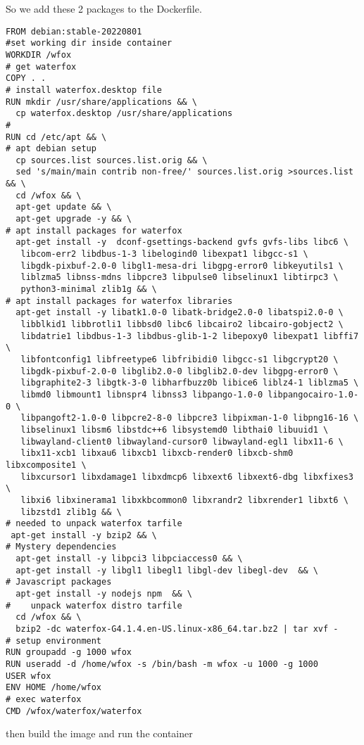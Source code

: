 \documentclass{article}  %
\begin{document}
So we add these 2 packages to the Dockerfile.
\begin{verbatim}
FROM debian:stable-20220801
#set working dir inside container
WORKDIR /wfox
# get waterfox
COPY . .
# install waterfox.desktop file
RUN mkdir /usr/share/applications && \
  cp waterfox.desktop /usr/share/applications
#
RUN cd /etc/apt && \
# apt debian setup
  cp sources.list sources.list.orig && \
  sed 's/main/main contrib non-free/' sources.list.orig >sources.list && \
  cd /wfox && \
  apt-get update && \
  apt-get upgrade -y && \
# apt install packages for waterfox
  apt-get install -y  dconf-gsettings-backend gvfs gvfs-libs libc6 \
   libcom-err2 libdbus-1-3 libelogind0 libexpat1 libgcc-s1 \
   libgdk-pixbuf-2.0-0 libgl1-mesa-dri libgpg-error0 libkeyutils1 \
   liblzma5 libnss-mdns libpcre3 libpulse0 libselinux1 libtirpc3 \
   python3-minimal zlib1g && \
# apt install packages for waterfox libraries
  apt-get install -y libatk1.0-0 libatk-bridge2.0-0 libatspi2.0-0 \
   libblkid1 libbrotli1 libbsd0 libc6 libcairo2 libcairo-gobject2 \
   libdatrie1 libdbus-1-3 libdbus-glib-1-2 libepoxy0 libexpat1 libffi7 \
   libfontconfig1 libfreetype6 libfribidi0 libgcc-s1 libgcrypt20 \
   libgdk-pixbuf-2.0-0 libglib2.0-0 libglib2.0-dev libgpg-error0 \
   libgraphite2-3 libgtk-3-0 libharfbuzz0b libice6 liblz4-1 liblzma5 \
   libmd0 libmount1 libnspr4 libnss3 libpango-1.0-0 libpangocairo-1.0-0 \
   libpangoft2-1.0-0 libpcre2-8-0 libpcre3 libpixman-1-0 libpng16-16 \
   libselinux1 libsm6 libstdc++6 libsystemd0 libthai0 libuuid1 \
   libwayland-client0 libwayland-cursor0 libwayland-egl1 libx11-6 \
   libx11-xcb1 libxau6 libxcb1 libxcb-render0 libxcb-shm0 libxcomposite1 \
   libxcursor1 libxdamage1 libxdmcp6 libxext6 libxext6-dbg libxfixes3 \
   libxi6 libxinerama1 libxkbcommon0 libxrandr2 libxrender1 libxt6 \
   libzstd1 zlib1g && \
# needed to unpack waterfox tarfile
 apt-get install -y bzip2 && \
# Mystery dependencies
  apt-get install -y libpci3 libpciaccess0 && \
  apt-get install -y libgl1 libegl1 libgl-dev libegl-dev  && \
# Javascript packages
  apt-get install -y nodejs npm  && \
#    unpack waterfox distro tarfile
  cd /wfox && \
  bzip2 -dc waterfox-G4.1.4.en-US.linux-x86_64.tar.bz2 | tar xvf -
# setup environment
RUN groupadd -g 1000 wfox
RUN useradd -d /home/wfox -s /bin/bash -m wfox -u 1000 -g 1000
USER wfox
ENV HOME /home/wfox
# exec waterfox
CMD /wfox/waterfox/waterfox
\end{verbatim}
then build the image and run the container
\end{document}
